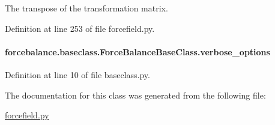 The transpose of the transformation matrix. 



Definition at line 253 of file forcefield.\-py.

\hypertarget{classforcebalance_1_1baseclass_1_1ForceBalanceBaseClass_a8088e1e20cbd6bc175fb9c9fe9fa0f18}{
\paragraph[{verbose\-\_\-options}]{\setlength{\rightskip}{0pt plus 5cm}forcebalance.\-baseclass.\-Force\-Balance\-Base\-Class.\-verbose\-\_\-options\hspace{0.3cm}{\ttfamily [inherited]}}}\label{classforcebalance_1_1baseclass_1_1ForceBalanceBaseClass_a8088e1e20cbd6bc175fb9c9fe9fa0f18}


Definition at line 10 of file baseclass.\-py.



The documentation for this class was generated from the following file\-:\begin{DoxyCompactItemize}
\item 
\hyperlink{forcefield_8py}{forcefield.\-py}\end{DoxyCompactItemize}
